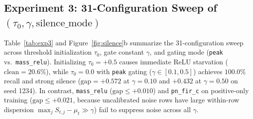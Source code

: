 \documentclass[11pt,a4paper]{article}
\begin{document}
\subsection{Experiment 3: 31-Configuration Sweep of $(\tau_0, \gamma, \text{silence\_mode})$}

Table~\ref{tab:exp3} and Figure~\ref{fig:silence}b summarize the 31-configuration sweep across threshold initialization $\tau_0$, gate constant $\gamma$, and gating mode (\texttt{peak} vs.\ \texttt{mass\_relu}). Initializing $\tau_0 = +0.5$ causes immediate ReLU starvation ($\text{clean} = 20.6\%$), while $\tau_0 = 0.0$ with \texttt{peak} gating ($\gamma \in [0.1, 0.5]$) achieves $100.0\%$ recall and strong silence ($\text{gap} = +0.572$ at $\gamma=0.10$ and $+0.432$ at $\gamma=0.50$ on seed 1234). In contrast, \texttt{mass\_relu} ($\text{gap} \le +0.010$) and \texttt{pn\_fir\_c} on positive-only training ($\text{gap} \le +0.021$, because uncalibrated noise rows have large within-row dispersion $\max_j S_{t,j} - \mu_t \gg \gamma$) fail to suppress noise across all $\gamma$.
\end{document}
